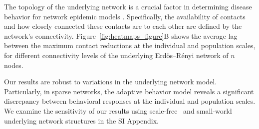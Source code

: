\documentclass[9pt,twocolumn,twoside]{pnas-new}
\begin{document}
The topology of the underlying network is a crucial factor in determining disease behavior for network epidemic models \cite{Ganesh05,Perez22,Meyers07}.
%
%
%
%
Specifically, the availability of contacts and how closely connected these contacts are to each other are defined by the network's connectivity.
%
Figure~\ref{fig:heatmaps_figure}B shows the average lag between the maximum contact reductions at the individual and population scales, for different connectivity levels of the underlying Erd\"{o}s–R\'{e}nyi network of $n$ nodes.

%
Our results are robust to variations in the underlying network model. Particularly, in sparse networks,
the adaptive behavior model reveals a significant discrepancy between behavioral responses at the individual and population scales.
We examine the sensitivity of our results using scale-free~\cite{Barabasi99} and small-world~\cite {Strogatz98} underlying network structures in the SI Appendix.
\end{document}
